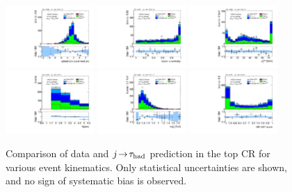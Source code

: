 \begin{figure}[!htpb]
  \includegraphics[width=0.30\textwidth]{figures/analysis/vbf-topCR/jets-etaprod}
  \includegraphics[width=0.30\textwidth]{figures/analysis/vbf-topCR/lep-eta-centrality}
  \includegraphics[width=0.30\textwidth]{figures/analysis/vbf-topCR/system-pt} \\
  \includegraphics[width=0.30\textwidth]{figures/analysis/vbf-topCR/n-jets30}
  \includegraphics[width=0.30\textwidth]{figures/analysis/vbf-topCR/dijet-m-veryhigh}
  \includegraphics[width=0.30\textwidth]{figures/analysis/vbf-topCR/BDTEve-VBF} \\
  \caption{Comparison of data and $j\!\rightarrow\!\tau_\text{had}$ prediction in the top CR for various event kinematics. Only statistical uncertainties are shown, and no sign of systematic bias is observed.}
  \label{fig:backgrounds-topCR-jets}
\end{figure}


